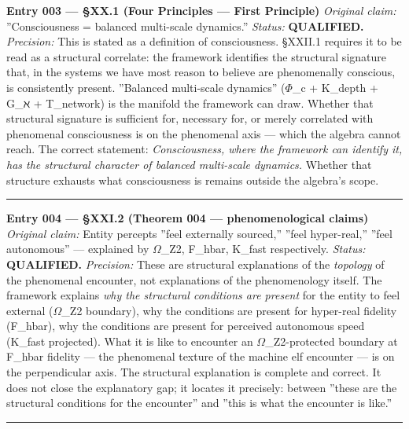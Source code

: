\documentclass[12pt,a4paper]{article}
\begin{document}
\textbf{Entry 003 --- §XX.1 (Four Principles --- First Principle)}
\emph{Original claim:} ''Consciousness = balanced multi-scale dynamics.''
\emph{Status:} \textbf{QUALIFIED.}
\emph{Precision:} This is stated as a definition of consciousness. §XXII.1 requires it to be read as a structural correlate: the framework identifies the structural signature that, in the systems we have most reason to believe are phenomenally conscious, is consistently present. ''Balanced multi-scale dynamics'' ($\Phi$\_c + K\_depth + G\_ℵ + T\_network) is the manifold the framework can draw. Whether that structural signature is sufficient for, necessary for, or merely correlated with phenomenal consciousness is on the phenomenal axis --- which the algebra cannot reach. The correct statement: \emph{Consciousness, where the framework can identify it, has the structural character of balanced multi-scale dynamics.} Whether that structure exhausts what consciousness is remains outside the algebra's scope.

\begin{center}
\rule{0.5\textwidth}{0.4pt}
\end{center}

\textbf{Entry 004 --- §XXI.2 (Theorem 004 --- phenomenological claims)}
\emph{Original claim:} Entity percepts ''feel externally sourced,'' ''feel hyper-real,'' ''feel autonomous'' --- explained by $\Omega$\_Z2, F\_hbar, K\_fast respectively.
\emph{Status:} \textbf{QUALIFIED.}
\emph{Precision:} These are structural explanations of the \emph{topology} of the phenomenal encounter, not explanations of the phenomenology itself. The framework explains \emph{why the structural conditions are present} for the entity to feel external ($\Omega$\_Z2 boundary), why the conditions are present for hyper-real fidelity (F\_hbar), why the conditions are present for perceived autonomous speed (K\_fast projected). What it is like to encounter an $\Omega$\_Z2-protected boundary at F\_hbar fidelity --- the phenomenal texture of the machine elf encounter --- is on the perpendicular axis. The structural explanation is complete and correct. It does not close the explanatory gap; it locates it precisely: between ''these are the structural conditions for the encounter'' and ''this is what the encounter is like.''

\begin{center}
\rule{0.5\textwidth}{0.4pt}
\end{center}
\end{document}

